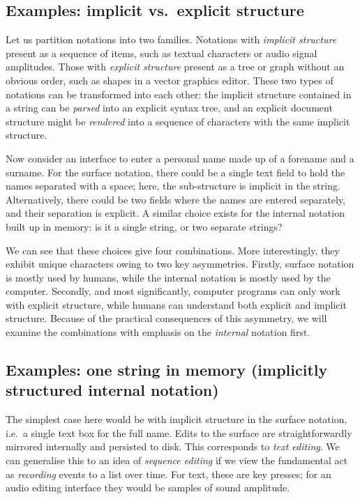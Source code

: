 \documentclass[ twoside,openright,titlepage,numbers=noenddot,headinclude,footinclude,cleardoublepage=empty,abstract=on,
                BCOR=5mm,paper=a4,fontsize=11pt
                ]{scrreprt}
\newcommand{\joel}[1]{}
\theoremstyle{definition}
\begin{document}
\hypertarget{examples-implicit-vs.-explicit-structure}{\subsection{Examples: implicit vs.~explicit
structure}\label{examples-implicit-vs.-explicit-structure}}

Let us partition notations into two families. Notations with
\emph{implicit structure} present as a sequence of items, such as
textual characters or audio signal amplitudes. Those with \emph{explicit
structure} present as a tree or graph without an obvious order, such as
shapes in a vector graphics editor. These two types of notations can be
transformed into each other: the implicit structure contained in a
string can be \emph{parsed} into an explicit syntax tree, and an
explicit document structure might be \emph{rendered} into a sequence of
characters with the same implicit structure.

Now consider an interface to enter a personal name made up of a forename
and a surname. For the surface notation, there could be a single text
field to hold the names separated with a space; here, the sub-structure
is implicit in the string. Alternatively, there could be two fields
where the names are entered separately, and their separation is
explicit. A similar choice exists for the internal notation built up in
memory: is it a single string, or two separate strings?

We can see that these choices give four combinations. More
interestingly, they exhibit unique characters owing to two key
asymmetries. Firstly, surface notation is mostly used by humans, while
the internal notation is mostly used by the computer. Secondly, and most
significantly, computer programs can only work with explicit structure,
while humans can understand both explicit and implicit structure.
\joel{informal vs formal structure?} Because of the practical
consequences of this asymmetry, we will examine the combinations with
emphasis on the \emph{internal} notation first.

\hypertarget{examples-one-string-in-memory-implicitly-structured-internal-notation}{\subsection{Examples: one string in memory (implicitly structured
internal
notation)}\label{examples-one-string-in-memory-implicitly-structured-internal-notation}}

The simplest case here would be with implicit structure in the surface
notation, i.e.~a single text box for the full name. Edits to the surface
are straightforwardly mirrored internally and persisted to disk. This
corresponds to \emph{text editing}. We can generalise this to an idea of
\emph{sequence editing} if we view the fundamental act as
\emph{recording} events to a list over time. For text, these are key
presses; for an audio editing interface they would be samples of sound
amplitude.
\end{document}
